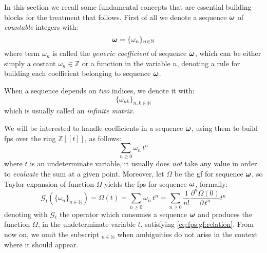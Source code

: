 
In this section we recall some fundamental concepts that are essential building
blocks for the treatment that follows. First of all we denote a sequence
$\boldsymbol{\omega}$ of \emph{countable} integers with:
\begin{displaymath}
    \boldsymbol{\omega}=\lbrace \omega_{n} \rbrace_{n\in\mathbb{N}}
\end{displaymath}
where term $\omega_{n}$ is called the \emph{generic coefficient} of
sequence $\boldsymbol{\omega}$, which can be either simply a costant $\omega_{n}\in\mathbb{Z}$
or a function in the variable $n$, denoting a rule for building each
coefficient belonging to sequence $\boldsymbol{\omega}$.

When a sequence depends on \emph{two} indices, we denote it with:
\begin{displaymath}
    \lbrace \omega_{nk} \rbrace_{n,k\in\mathbb{N}}
\end{displaymath}
which is usually called an \emph{infinite matrix}.

We will be interested to handle coefficients in a sequence $\boldsymbol{\omega}$,
using them to build \ac{fps} over the ring $\mathbb{Z}[\![t]\!]$, as follows:
\begin{equation}
    \sum_{n\geq0}{\omega_{n}\,t^{n}}
    \label{eq:fps:formally}
\end{equation}
where $t$ is an undeterminate variable, it usually does \emph{not} take
any value in order to \emph{evaluate} the sum at a given point. 
Moreover, let $\Omega$ be  the \ac{gf} for sequence $\boldsymbol{\omega}$, so
Taylor expansion of function $\Omega$ yields the \ac{fps} for sequence $\boldsymbol{\omega}$, 
formally: 
\begin{equation}
    \mathcal{G}_{t}\left(\lbrace\omega_{n}\rbrace_{n\in\mathbb{N}}\right)=\Omega(t)
        =\sum_{n\geq0}{\omega_{n}\,t^{n}} = \sum_{n\geq0}{\frac{1}{n!}\frac{
            \partial^{n}\Omega(0)}{\partial\,t^{n}}t^{n}}
    \label{eq:fps:gf:relation}
\end{equation}
denoting with $\mathcal{G}_{t}$ the operator which consumes a sequence
$\boldsymbol{\omega}$ and produces the function $\Omega$, in the undeterminate
variable $t$, satisfying \autoref{eq:fps:gf:relation}. From now on, we
omit the subscript $_{n\in\mathbb{N}}$ when ambiguities do not arise 
in the context where it should appear.


